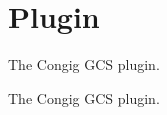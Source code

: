 \hypertarget{group___congig}{\section{\-Plugin}
\label{group___congig}
}


\-The \-Congig \-G\-C\-S plugin.  


\-The \-Congig \-G\-C\-S plugin. 